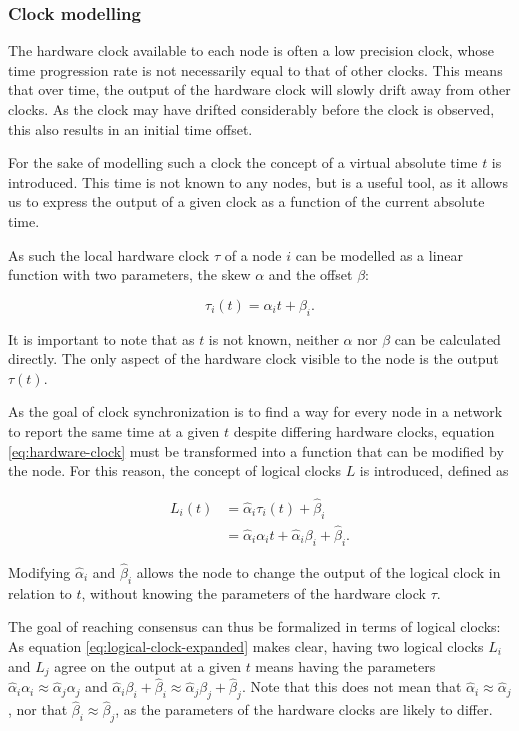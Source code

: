 \documentclass[a4paper,12pt]{article}
\begin{document}
\subsubsection{Clock modelling}

The hardware clock available to each node is often a low precision clock, whose time progression rate is not necessarily equal to that of other clocks. This means that over time, the output of the hardware clock will slowly drift away from other clocks. As the clock may have drifted considerably before the clock is observed, this also results in an initial time offset.

For the sake of modelling such a clock the concept of a virtual absolute time $t$ is introduced. This time is not known to any nodes, but is a useful tool, as it allows us to express the output of a given clock as a function of the current absolute time.

As such the local hardware clock $\tau$ of a node $i$ can be modelled as a linear function with two parameters, the skew $\alpha$ and the offset $\beta$:

\begin{equation}\label{eq:hardware-clock}
    \tau_i(t) = \alpha_i t + \beta_i.
\end{equation}

It is important to note that as $t$ is not known, neither $\alpha$ nor $\beta$ can be calculated directly. The only aspect of the hardware clock visible to the node is the output $\tau(t)$.

As the goal of clock synchronization is to find a way for every node in a network to report the same time at a given $t$ despite differing hardware clocks, equation \ref{eq:hardware-clock} must be transformed into a function that can be modified by the node. For this reason, the concept of logical clocks $L$ is introduced, defined as

\begin{align}
    L_i(t) &= \hat\alpha_i \tau_i(t) + \hat\beta_i \nonumber \\
        &= \hat\alpha_i \alpha_i t + \hat\alpha_i \beta_i + \hat\beta_i. \label{eq:logical-clock-expanded}
\end{align}

Modifying $\hat\alpha_i$ and $\hat\beta_i$ allows the node to change the output of the logical clock in relation to $t$, without knowing the parameters of the hardware clock $\tau$.

The goal of reaching consensus can thus be formalized in terms of logical clocks: As equation \ref{eq:logical-clock-expanded} makes clear, having two logical clocks $L_i$ and $L_j$ agree on the output at a given $t$ means having the parameters $\hat\alpha_i \alpha_i \approx \hat\alpha_j \alpha_j$ and $\hat\alpha_i \beta_i + \hat\beta_i \approx \hat\alpha_j \beta_j + \hat\beta_j$. Note that this does not mean that $\hat\alpha_i \approx \hat\alpha_j$, nor that $\hat\beta_i \approx \hat\beta_j$, as the parameters of the hardware clocks are likely to differ.
\end{document}

